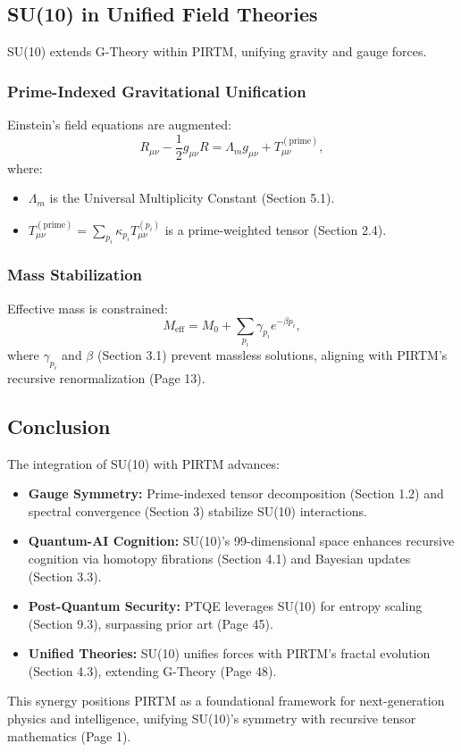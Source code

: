 \documentclass{article}
\theoremstyle{plain}
\begin{document}
\subsection{SU(10) in Unified Field Theories}

SU(10) extends G-Theory within PIRTM, unifying gravity and gauge forces.

\subsubsection{Prime-Indexed Gravitational Unification}
Einstein’s field equations are augmented:
\[
R_{\mu\nu} - \frac{1}{2} g_{\mu\nu} R = \Lambda_m g_{\mu\nu} + T_{\mu\nu}^{(\text{prime})},
\]
where:
\begin{itemize}
    \item \( \Lambda_m \) is the Universal Multiplicity Constant (Section 5.1).
    \item \( T_{\mu\nu}^{(\text{prime})} = \sum_{p_i} \kappa_{p_i} T_{\mu\nu}^{(p_i)} \) is a prime-weighted tensor (Section 2.4).
\end{itemize}

\subsubsection{Mass Stabilization}
Effective mass is constrained:
\[
M_{\text{eff}} = M_0 + \sum_{p_i} \gamma_{p_i} e^{-\beta p_i},
\]
where \( \gamma_{p_i} \) and \( \beta \) (Section 3.1) prevent massless solutions, aligning with PIRTM’s recursive renormalization (Page 13).

\subsection{Conclusion}

The integration of SU(10) with PIRTM advances:
\begin{itemize}
    \item \textbf{Gauge Symmetry:} Prime-indexed tensor decomposition (Section 1.2) and spectral convergence (Section 3) stabilize SU(10) interactions.
    \item \textbf{Quantum-AI Cognition:} SU(10)’s 99-dimensional space enhances recursive cognition via homotopy fibrations (Section 4.1) and Bayesian updates (Section 3.3).
    \item \textbf{Post-Quantum Security:} PTQE leverages SU(10) for entropy scaling (Section 9.3), surpassing prior art (Page 45).
    \item \textbf{Unified Theories:} SU(10) unifies forces with PIRTM’s fractal evolution (Section 4.3), extending G-Theory (Page 48).
\end{itemize}
This synergy positions PIRTM as a foundational framework for next-generation physics and intelligence, unifying SU(10)’s symmetry with recursive tensor mathematics (Page 1).
\end{document}
